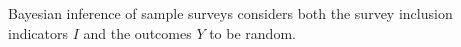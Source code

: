 \documentclass[12pt,a4paper]{article}
\begin{document}
Bayesian inference of sample surveys considers both the survey inclusion indicators $I$ and the outcomes $Y$ to be random.


\end{document}
